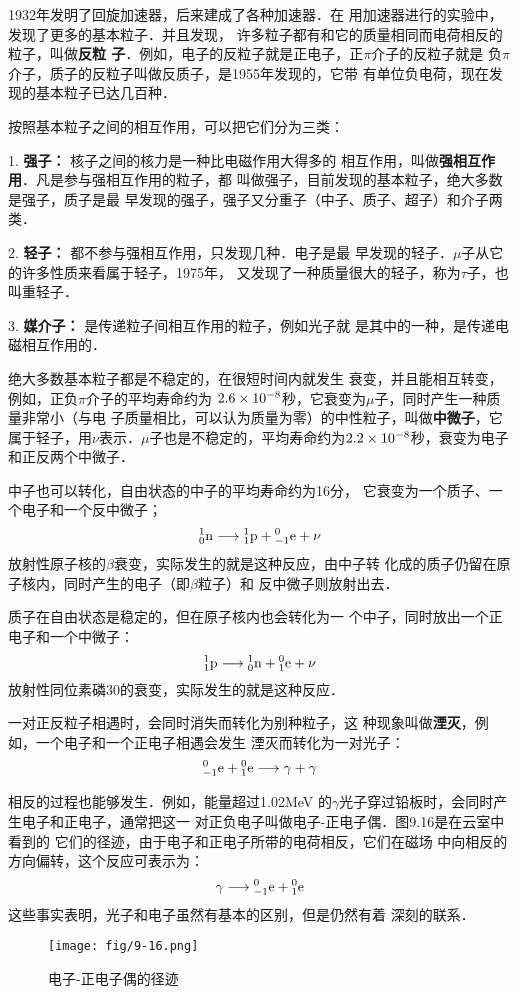 1932年发明了回旋加速器，后来建成了各种加速器．在
用加速器进行的实验中，发现了更多的基本粒子．并且发现，
许多粒子都有和它的质量相同而电荷相反的粒子，叫做\textbf{反粒
子}．例如，电子的反粒子就是正电子，正$\pi$介子的反粒子就是
负$\pi$介子，质子的反粒子叫做反质子，是1955年发现的，它带
有单位负电荷，现在发现的基本粒子已达几百种．

按照基本粒子之间的相互作用，可以把它们分为三类：

1. \textbf{强子：} 核子之间的核力是一种比电磁作用大得多的
相互作用，叫做\textbf{强相互作用}．凡是参与强相互作用的粒子，都
叫做强子，目前发现的基本粒子，绝大多数是强子，质子是最
早发现的强子，强子又分重子（中子、质子、超子）和介子两类．

2. \textbf{轻子：} 都不参与强相互作用，只发现几种．电子是最
早发现的轻子．$\mu$子从它的许多性质来看属于轻子，1975年，
又发现了一种质量很大的轻子，称为$\tau$子，也叫重轻子．

3. \textbf{媒介子：} 是传递粒子间相互作用的粒子，例如光子就
是其中的一种，是传递电磁相互作用的．

绝大多数基本粒子都是不稳定的，在很短时间内就发生
衰变，并且能相互转变，例如，正负$\pi$介子的平均寿命约为
$2.6\x10^{-8}$秒，它衰变为$\mu$子，同时产生一种质量非常小（与电
子质量相比，可以认为质量为零）的中性粒子，叫做\textbf{中微子}，它
属于轻子，用$\nu$表示．$\mu$子也是不稳定的，平均寿命约为$2.2\x
10^{-8}$秒，衰变为电子和正反两个中微子．

中子也可以转化，自由状态的中子的平均寿命约为16分，
它衰变为一个质子、一个电子和一个反中微子；
\[\atom{n}{1}{0}\longrightarrow \atom{p}{1}{1}+\atom{e}{0}{-1}+\nu   \]
放射性原子核的$\beta$衰变，实际发生的就是这种反应，由中子转
化成的质子仍留在原子核内，同时产生的电子（即$\beta$粒子）和
反中微子则放射出去．

质子在自由状态是稳定的，但在原子核内也会转化为一
个中子，同时放出一个正电子和一个中微子：
\[\atom{p}{1}{1}\longrightarrow \atom{n}{1}{0}+\atom{e}{0}{1}+\nu   \]
放射性同位素磷30的衰变，实际发生的就是这种反应．

一对正反粒子相遇时，会同时消失而转化为别种粒子，这
种现象叫做\textbf{湮灭}，例如，一个电子和一个正电子相遇会发生
湮灭而转化为一对光子：
\[\atom{e}{0}{-1}+\atom{e}{0}{1}\longrightarrow \gamma+\gamma  \]

相反的过程也能够发生．例如，能量超过1.02MeV
的$\gamma$光子穿过铅板时，会同时产生电子和正电子，通常把这一
对正负电子叫做电子-正电子偶．图9.16是在云室中看到的
它们的径迹，由于电子和正电子所带的电荷相反，它们在磁场
中向相反的方向偏转，这个反应可表示为：
\[\gamma\longrightarrow \atom{e}{0}{-1}+\atom{e}{0}{1} \]
这些事实表明，光子和电子虽然有基本的区别，但是仍然有着
深刻的联系．
\begin{figure}[htp]\centering
\texttt{[image: fig/9-16.png]}
\caption{电子-正电子偶的径迹}
\end{figure}



